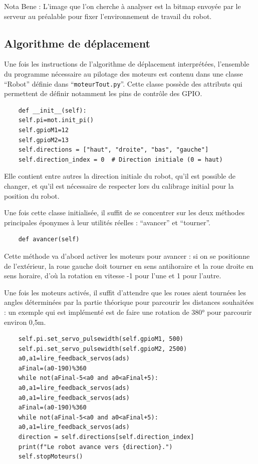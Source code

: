 \documentclass[a4paper,12pt]{report}  %
\begin{document}
Nota Bene : L’image que l’on cherche à analyser est la bitmap envoyée par le serveur au préalable pour fixer l’environnement de travail du robot.

\subsection{Algorithme de déplacement}

Une fois les instructions de l’algorithme de déplacement interprétées, l’ensemble du programme nécessaire au pilotage des moteurs est contenu dans une classe “Robot” définie dans “\texttt{moteurTout.py}”. Cette classe possède des attributs qui permettent de définir notamment les pins de contrôle des GPIO.

\begin{lstlisting}
	def __init__(self):
	self.pi=mot.init_pi()
	self.gpioM1=12
	self.gpioM2=13
	self.directions = ["haut", "droite", "bas", "gauche"]
	self.direction_index = 0  # Direction initiale (0 = haut)
\end{lstlisting}

Elle contient entre autres la direction initiale du robot, qu’il est possible de changer, et qu’il est nécessaire de respecter lors du calibrage initial pour la position du robot.

Une fois cette classe initialisée, il suffit de se concentrer sur les deux méthodes principales éponymes à leur utilités réelles : “avancer” et “tourner”.

\begin{lstlisting}
	def avancer(self)
\end{lstlisting}

Cette méthode va d’abord activer les moteurs pour avancer : si on se positionne de l’extérieur, la roue gauche doit tourner en sens antihoraire et la roue droite en sens horaire, d’où la rotation en vitesse -1 pour l’une et 1 pour l’autre.

Une fois les moteurs activés, il suffit d’attendre que les roues aient tournées les angles déterminées par la partie théorique pour parcourir les distances souhaitées : un exemple qui est implémenté est de faire une rotation de 380° pour parcourir environ 0,5m.

\begin{lstlisting}
	self.pi.set_servo_pulsewidth(self.gpioM1, 500)
	self.pi.set_servo_pulsewidth(self.gpioM2, 2500)
	a0,a1=lire_feedback_servos(ads)
	aFinal=(a0-190)%360
	while not(aFinal-5<a0 and a0<aFinal+5):
	a0,a1=lire_feedback_servos(ads)
	a0,a1=lire_feedback_servos(ads)
	aFinal=(a0-190)%360
	while not(aFinal-5<a0 and a0<aFinal+5):
	a0,a1=lire_feedback_servos(ads)
	direction = self.directions[self.direction_index]
	print(f"Le robot avance vers {direction}.")
	self.stopMoteurs()
\end{lstlisting}
\end{document}
